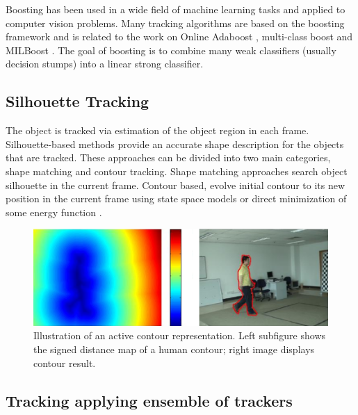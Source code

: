 Boosting has been used in a wide field of machine learning tasks and applied to computer vision problems. Many tracking algorithms are based on the boosting framework \cite{Freund1997a} and is related to the work on Online Adaboost \cite{Avidan2007,Grabner2008,Oza2000}, multi-class boost \cite{Saffari2010} and MILBoost \cite{Babenko2010}. The goal of boosting is to combine many weak classifiers (usually decision stumps) into a linear strong classifier.


\subsection{Silhouette Tracking}

The object is tracked via estimation of the object region in each frame. Silhouette-based methods provide an accurate shape description for the objects that are tracked. These approaches can be divided into two main categories, shape matching and contour tracking. Shape matching \cite{Li2001} approaches search object silhouette in the current frame. Contour based, evolve initial contour to its new position in the current frame using state space models or direct minimization of some energy function \cite{Cremers2003}.

\begin{figure}[h!]
	\centering
		\includegraphics[width=0.9\linewidth]{Figures/contour.png}
	\caption{Illustration of an active contour representation. Left subfigure shows the signed distance map of a human contour; right image displays contour result.}
	\label{fig::contour}
\end{figure}	

\subsection{Tracking applying ensemble of trackers}


